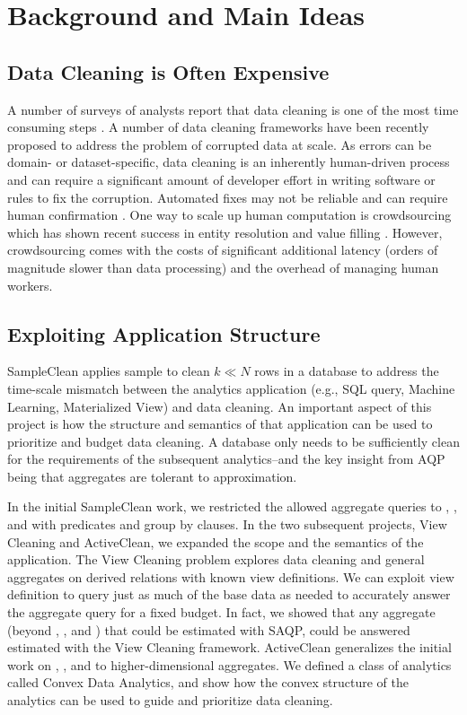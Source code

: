 \section{Background and Main Ideas}

\subsection{Data Cleaning is Often Expensive}
A number of surveys of analysts report that data cleaning is one of the most time consuming steps \cite{kandel2012enterprise, nytimes}.
A number of data cleaning frameworks have been recently proposed to address the problem of corrupted data at scale\cite{khayyat2015bigdansing, chu2015katara, sampleclean}.
As errors can be domain- or dataset-specific, data cleaning is an inherently human-driven process and can require a significant amount of developer effort in writing software or rules to fix the corruption.
Automated fixes may not be reliable and can require human confirmation \cite{DBLP:journals/pvldb/YakoutENOI11}.
One way to scale up human computation is crowdsourcing which has shown recent success in entity resolution and value filling \cite{gokhale2014corleone, park2014crowdfill, sampleclean,chu2015katara}.
However, crowdsourcing comes with the costs of significant additional latency (orders of magnitude slower than data processing) and the overhead of managing human workers.

\subsection{Exploiting Application Structure}
SampleClean applies sample to clean $k\ll N$ rows in a database to address the time-scale mismatch between the analytics application (e.g., SQL query, Machine Learning, Materialized View) and data cleaning.
An important aspect of this project is how the structure and semantics of that application can be used to prioritize and budget data cleaning.
A database only needs to be sufficiently clean for the requirements of the subsequent analytics--and the key insight from AQP being that aggregates are tolerant to approximation.

In the initial SampleClean work, we restricted the allowed aggregate queries to \sumfunc, \countfunc, and \avgfunc with predicates and group by clauses.
In the two subsequent projects, View Cleaning and ActiveClean, we expanded the scope and the semantics of the application. 
The View Cleaning problem explores data cleaning and general aggregates on derived relations with known view definitions.
We can exploit view definition to query just as much of the base data as needed to accurately answer the aggregate query for a fixed budget.
In fact, we showed that any aggregate (beyond \sumfunc, \countfunc, and \avgfunc) that could be estimated with SAQP\cite{agarwalknowing}, could be answered estimated with the View Cleaning framework.
ActiveClean generalizes the initial work on \sumfunc, \countfunc, and \avgfunc to higher-dimensional aggregates.
We defined a class of analytics called Convex Data Analytics, and show how the convex structure of the analytics can be used to guide and prioritize data cleaning.

